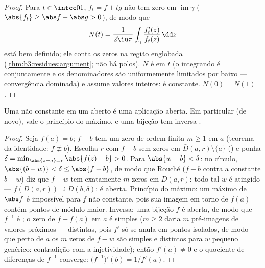 \begin{proof}
Para $t \in \intcc01$, $f_t = f + tg$ não tem zero em $\operatorname{im}\gamma$ ($\abs{f_t} \geq \abs f - \abs g >
0$), de modo que
\[
N(t) = \frac1{2\iu\pi}\int_\gamma
\frac{f_t'(z)}{f_t(z)}\,\dd z
\]
está bem definido; ele conta os zeros na região englobada
(\cref{thm:b3:residues:argument}; não há polos). $N$ é  em $t$ (o
integrando é conjuntamente  e os denominadores são
uniformemente limitados por baixo --- convergência dominada) e assume
valores inteiros: é constante. $N(0) = N(1)$.
\end{proof}

\begin{corollary}
\label{cor:b3:residues:openmapping}
Uma  não constante em um aberto  é uma aplicação
aberta. Em particular (de novo), vale o princípio do máximo, e uma
bijeção  tem inversa .
\end{corollary}

\begin{proof}
Seja $f(a) = b$; $f - b$ tem um zero de ordem finita $m
\geq 1$ em $a$
(teorema da identidade: $f \not\equiv b$). Escolha $r$ com $f - b$ sem zeros
em $\bar D(a, r)\setminus\{a\}$ () e ponha $\delta = \min_{\abs{z - a} =
r}\abs{f(z) - b} > 0$. Para $\abs{w - b} < \delta$: no círculo, $\abs{(b - w)} < \delta \leq \abs{f - b}$,
de modo que Rouché ($f - b$ contra a constante $b - w$) diz que
$f - w$ tem exatamente $m$ zeros em $D(a, r)$: todo tal $w$ é
atingido --- $f(D(a,r)) \supseteq D(b, \delta)$: é aberta. Princípio do máximo: um máximo  de
$\abs f$ é impossível para $f$ não constante, pois sua imagem em
torno de $f(a)$ contém pontos de módulo maior. Inversa: uma bijeção
 $f$ é aberta, de modo que $f^{-1}$ é ; o zero
de $f - f(a)$ em $a$ é simples ($m \geq 2$ daria $m$ pré-imagens de valores
próximos --- distintas, pois $f'$ só se anula em pontos isolados, de
modo que perto de $a$ os $m$ zeros de $f - w$ são simples e
distintos para $w$ pequeno genérico: contradição com a
injetividade); então $f'(a) \neq 0$ e o quociente de diferenças de $f^{-1}$
converge: $\bigl(f^{-1}\bigr)'(b) =
1/f'(a)$.
\end{proof}

